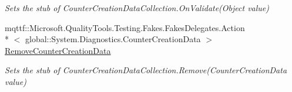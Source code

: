 \begin{DoxyCompactItemize}
\begin{DoxyCompactList}\small\item\em Sets the stub of Counter\-Creation\-Data\-Collection.\-On\-Validate(\-Object value)\end{DoxyCompactList}\item 
mqttf\-::\-Microsoft.\-Quality\-Tools.\-Testing.\-Fakes.\-Fakes\-Delegates.\-Action\\*
$<$ global\-::\-System.\-Diagnostics.\-Counter\-Creation\-Data $>$ \hyperlink{class_system_1_1_diagnostics_1_1_fakes_1_1_stub_counter_creation_data_collection_ac133adbc3d47b47cbcf9e03f512aa338}{Remove\-Counter\-Creation\-Data}
\begin{DoxyCompactList}\small\item\em Sets the stub of Counter\-Creation\-Data\-Collection.\-Remove(\-Counter\-Creation\-Data value)\end{DoxyCompactList}\end{DoxyCompactItemize}
